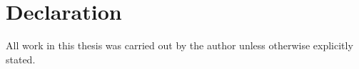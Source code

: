 \chapter{Declaration}

All work in this thesis was carried out by the author unless otherwise explicitly stated.
